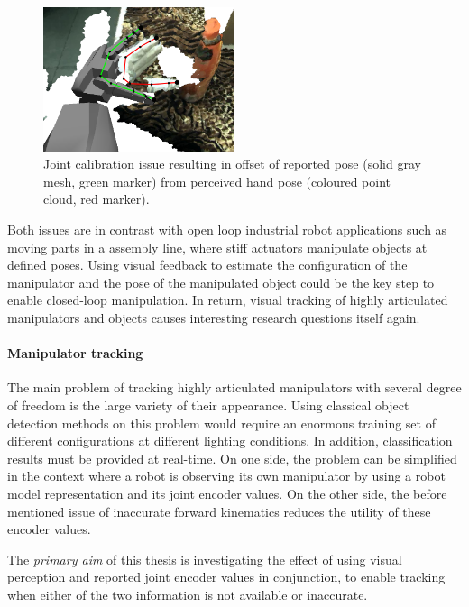 \begin{figure}
\captionsetup{width=0.6\textwidth}
\centering
\includegraphics[width=0.5\textwidth]{images/valkyrie/joint_calibration_issue.png}
\caption[Joint calibration issue]{Joint calibration issue resulting in offset of reported pose (solid gray mesh, green marker) from perceived hand pose (coloured point cloud, red marker).}
\label{fig:calibration_issue}
\end{figure}

Both issues are in contrast with open loop industrial robot applications such as moving parts in a assembly line, where stiff actuators manipulate objects at defined poses. Using visual feedback to estimate the configuration of the manipulator and the pose of the manipulated object could be the key step to enable closed-loop manipulation.
In return, visual tracking of highly articulated manipulators and objects causes interesting research questions itself again.

\paragraph{Manipulator tracking}
The main problem of tracking highly articulated manipulators with several degree of freedom is the large variety of their appearance. Using classical object detection methods on this problem would require an enormous training set of different configurations at different lighting conditions. In addition, classification results must be provided at real-time. On one side, the problem can be simplified in the context where a robot is observing its own manipulator by using a robot model representation and its joint encoder values. On the other side, the before mentioned issue of inaccurate forward kinematics reduces the utility of these encoder values.

The \emph{primary aim} of this thesis is investigating the effect of using visual perception and reported joint encoder values in conjunction, to enable tracking when either of the two information is not available or inaccurate.

